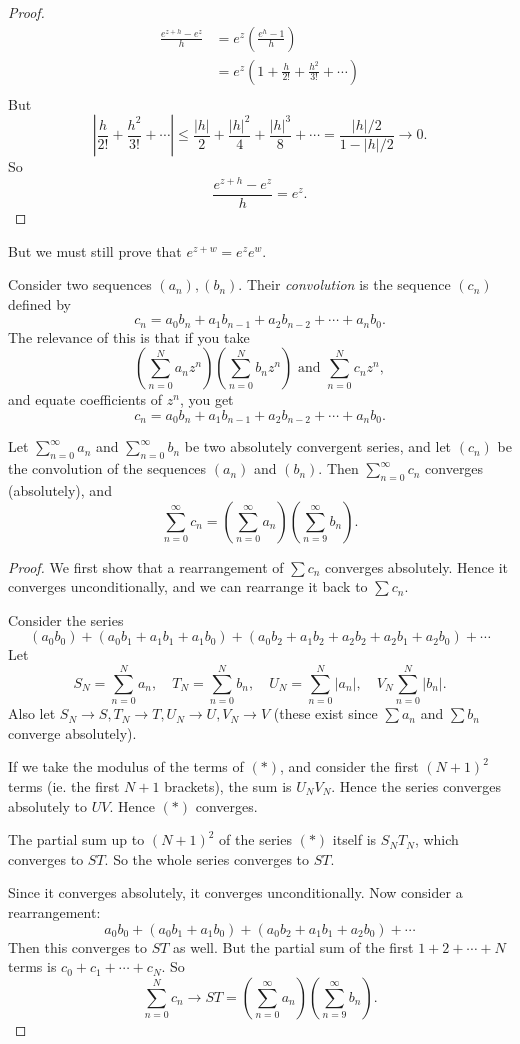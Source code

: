 \documentclass[a4paper]{article}
\begin{document}
\begin{proof}
  \begin{align*}
    \frac{e^{z + h} - e^z}{h} &= e^z \left(\frac{e^h - 1}{h}\right)\\
    &= e^z\left(1 + \frac{h}{2!} + \frac{h^2}{3!} + \cdots\right)\\
  \end{align*}
  But
  \[
    \left|\frac{h}{2!} + \frac{h^2}{3!} + \cdots \right| \leq \frac{|h|}{2} + \frac{|h|^2}{4} + \frac{|h|^3}{8} + \cdots = \frac{|h|/2}{1 - |h|/2} \to 0.
  \]
  So
  \[
    \frac{e^{z + h} - e^z}{h} = e^z.
  \]
\end{proof}

But we must still prove that $e^{z + w} = e^ze^w$.

Consider two sequences $(a_n), (b_n)$. Their \emph{convolution} is the sequence $(c_n)$ defined by
\[
  c_n = a_0b_n + a_1b_{n - 1} + a_2b_{n - 2} + \cdots + a_nb_0.
\]
The relevance of this is that if you take
\[
  \left(\sum_{n = 0}^N a_nz^n\right)\left(\sum_{n = 0}^N b_nz^n\right)\text{ and }\sum_{n = 0}^N c_n z^n,
\]
and equate coefficients of $z^n$, you get
\[
  c_n = a_0b_n + a_1b_{n - 1} + a_2b_{n - 2} + \cdots + a_nb_0.
\]
\begin{thm}
  Let $\sum_{n = 0}^\infty a_n$ and $\sum_{n = 0}^\infty b_n$ be two absolutely convergent series, and let $(c_n)$ be the convolution of the sequences $(a_n)$ and $(b_n)$. Then $\sum_{n = 0}^\infty c_n$ converges (absolutely), and
  \[
    \sum_{n = 0}^{\infty} c_n = \left(\sum_{n = 0}^\infty a_n\right)\left(\sum_{n = 9}^\infty b_n \right).
  \]
\end{thm}

\begin{proof}
  We first show that a rearrangement of $\sum c_n$ converges absolutely. Hence it converges unconditionally, and we can rearrange it back to $\sum c_n$.

  Consider the series
  \[
    (a_0b_0) + (a_0 b_1 + a_1b_1 + a_1b_0) + (a_0 b_2 + a_1 b_2 + a_2b_2 + a_2b_1 + a_2b_0) + \cdots\tag{$*$}
  \]
  Let
  \[
    S_N = \sum_{n = 0}^{N}a_n, \quad T_N = \sum_{n = 0}^N b_n,\quad U_N = \sum_{n = 0}^N | a_n|,\quad V_N \sum_{n = 0}^N|b_n|.
  \]
  Also let $S_N \to S, T_N \to T, U_N \to U, V_N \to V$ (these exist since $\sum a_n$ and $\sum b_n$ converge absolutely).

  If we take the modulus of the terms of $(*)$, and consider the first $(N + 1)^2$ terms (ie. the first $N + 1$ brackets), the sum is $U_NV_N$. Hence the series converges absolutely to $UV$. Hence $(*)$ converges.

  The partial sum up to $(N + 1)^2$ of the series $(*)$ itself is $S_NT_N$, which converges to $ST$. So the whole series converges to $ST$.

  Since it converges absolutely, it converges unconditionally. Now consider a rearrangement:
  \[
    a_0 b_0 + (a_0b_1 + a_1b_0) + (a_0b_2 + a_1b_1 + a_2b_0) + \cdots
  \]
  Then this converges to $ST$ as well. But the partial sum of the first $1 + 2 + \cdots + N$ terms is $c_0 + c_1 + \cdots + c_N$. So
  \[
    \sum_{n = 0}^N c_n \to ST = \left(\sum_{n = 0}^\infty a_n\right)\left(\sum_{n = 9}^\infty b_n \right).
  \]
\end{proof}
\end{document}
